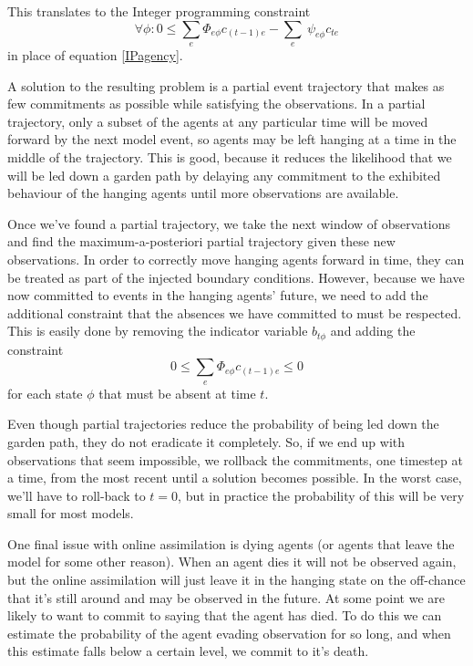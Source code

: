 \documentclass{article}
\begin{document}
This translates to the Integer programming constraint
\begin{equation}
\forall\phi: 0 \le \sum_e  \Phi_{e\phi}c_{(t-1)e} -  \sum_e\ \psi_{e\phi} c_{te}
\end{equation}
in place of equation \ref{IPagency}.

A solution to the resulting problem is a partial event trajectory that makes as few commitments as possible while satisfying the observations. In a partial trajectory, only a subset of the agents at any particular time will be moved forward by the next model event, so agents may be left hanging at a time in the middle of the trajectory. This is good, because it reduces the likelihood that we will be led down a garden path by delaying any commitment to the exhibited behaviour of the hanging agents until more observations are available.

Once we've found a partial trajectory, we take the next window of observations and find the maximum-a-posteriori partial trajectory given these new observations. In order to correctly move hanging agents forward in time, they can be treated as part of the injected boundary conditions. However, because we have now committed to events in the hanging agents' future, we need to add the additional constraint that the absences we have committed to must be respected. This is easily done by removing the indicator variable $b_{t\phi}$ and adding the constraint
\[
0 \le \sum_e  \Phi_{e\phi}c_{(t-1)e} \le 0
\]
for each state $\phi$ that must be absent at time $t$.

Even though partial trajectories reduce the probability of being led down the garden path, they do not eradicate it completely. So, if we end up with observations that seem impossible, we rollback the commitments, one timestep at a time, from the most recent until a solution becomes possible. In the worst case, we'll have to roll-back to $t=0$, but in practice the probability of this will be very small for most models.

One final issue with online assimilation is dying agents (or agents that leave the model for some other reason). When an agent dies it will not be observed again, but the online assimilation will just leave it in the hanging state on the off-chance that it's still around and may be observed in the future. At some point we are likely to want to commit to saying that the agent has died. To do this we can estimate the probability of the agent evading observation for so long, and when this estimate falls below a certain level, we commit to it's death.
\end{document}
